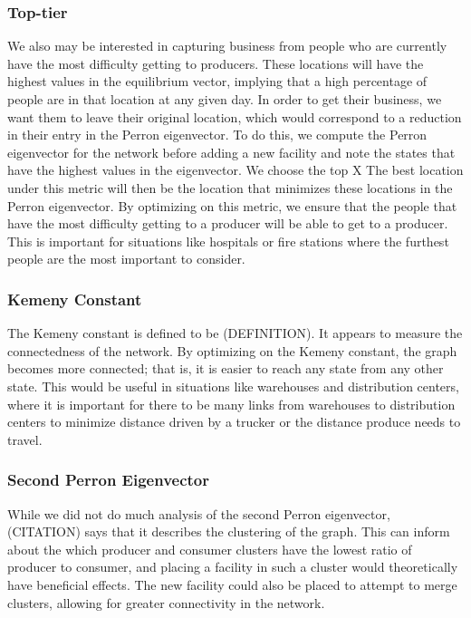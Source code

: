 \documentclass[twoside,twocolumn]{article}
\begin{document}
\subsubsection{Top-tier}
We also may be interested in capturing business from people who are currently have the most difficulty getting to producers.
These locations will have the highest values in the equilibrium vector, implying that a high percentage of people are in that location at any given day.
In order to get their business, we want them to leave their original location, which would correspond to a reduction in their entry in the Perron eigenvector.
To do this, we compute the Perron eigenvector for the network before adding a new facility and note the states that have the highest values in the eigenvector.
We choose the top X%
The best location under this metric will then be the location that minimizes these locations in the Perron eigenvector.
By optimizing on this metric, we ensure that the people that have the most difficulty getting to a producer will be able to get to a producer.
This is important for situations like hospitals or fire stations where the furthest people are the most important to consider.

\subsubsection{Kemeny Constant}
The Kemeny constant is defined to be (DEFINITION).
It appears to measure the connectedness of the network.
By optimizing on the Kemeny constant, the graph becomes more connected; that is, it is easier to reach any state from any other state.
This would be useful in situations like warehouses and distribution centers, where it is important for there to be many links from warehouses to distribution centers to minimize distance driven by a trucker or the distance produce needs to travel.

\subsubsection{Second Perron Eigenvector}
While we did not do much analysis of the second Perron eigenvector, (CITATION) says that it describes the clustering of the graph.
This can inform about the which producer and consumer clusters have the lowest ratio of producer to consumer, and placing a facility in such a cluster would theoretically have beneficial effects.
The new facility could also be placed to attempt to merge clusters, allowing for greater connectivity in the network.
\end{document}
